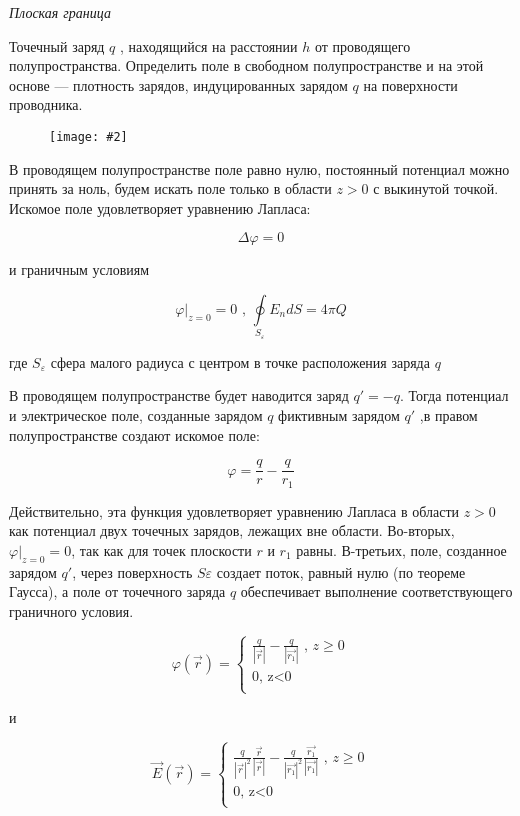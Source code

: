 \documentclass[a4paper,12pt]{article}
\newcommand{\kr}[1]{\textit{#1}}
\newcommand{\fc}[1]{\[#1\]}
\newcommand{\imc}[2][0.7\textwidth]{%
    \begin{figure}[h!]
        \centering
        \texttt{[image: \#2]}
    \end{figure}%
}
\begin{document}
\kr{Плоская граница}

Точечный заряд  $q$ , находящийся на расстоянии  $h$  от проводящего полупространства. Определить поле в свободном полупространстве и на этой основе — плотность зарядов, индуцированных зарядом  $q$  на поверхности проводника.

\imc[0.6\textwidth]{14.png}

В проводящем полупространстве поле равно нулю, постоянный потенциал можно принять за ноль, будем искать поле только в области $z>0$ с выкинутой точкой. Искомое поле удовлетворяет уравнению Лапласа:

\fc{\Delta \varphi=0}

и граничным условиям

\fc{\varphi|_{z=0}=0 \text{ , } \underset{S_\varepsilon}{\oint}E_n dS=4 \pi Q}

\newpage

где $S_\varepsilon $ сфера малого радиуса с центром в точке
расположения заряда $q$

В проводящем полупространстве будет наводится заряд $q'=-q$. Тогда потенциал и электрическое поле, созданные зарядом $q$ фиктивным зарядом $q'$
,в правом полупространстве создают искомое поле:

\fc{\varphi=\frac{q}{r}-\frac{q}{r_1}}

Действительно, эта функция удовлетворяет уравнению Лапласа в
области $z>0$ как потенциал двух точечных зарядов, лежащих вне области. Во-вторых, $\varphi |_{z=0}=0$, так как для точек плоскости $r$ и $r_1$ равны.
В-третьих, поле, созданное зарядом $q'$, через поверхность $S\varepsilon$ создает
поток, равный нулю (по теореме Гаусса), а поле от точечного заряда
$q$ обеспечивает выполнение соответствующего граничного условия.

\fc{\varphi(\vec{r}) =
\left\{
\begin{aligned}
\frac{q}{|\vec{r}|}-\frac{q}{|\vec{r_1}|}\text{ , }z\geq0 \\
 0	\text{, z<0}	\\
\end{aligned}
\right.}

и 

\fc{\vec{E}(\vec{r}) =
\left\{
\begin{aligned}
\frac{q}{|\vec{r}|^2}\frac{\vec{r}}{|\vec{r}|}-\frac{q}{|\vec{r_1}|^2}\frac{\vec{r_1}}{|\vec{r_1}|}\text{ , }z\geq0 \\
 0	\text{, z<0}	\\
\end{aligned}
\right.}
\end{document}
